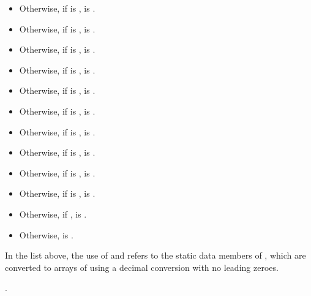 \begin{itemdescr}
\begin{itemize}
\item
Otherwise, if  is ,
 is .

\item
Otherwise, if  is ,
 is .

\item
Otherwise, if  is ,
 is .

\item
Otherwise, if  is ,
 is .

\item
Otherwise, if  is ,
 is .

\item
Otherwise, if  is ,
 is .

\item
Otherwise, if  is ,
 is .

\item
Otherwise, if  is ,
 is .

\item
Otherwise, if  is ,
 is .

\item
Otherwise, if  is ,
 is .

\item
Otherwise, if ,
 is .

\item
Otherwise,  is
.
\end{itemize}

In the list above,
the use of  and 
refers to the static data members of ,
which are converted to arrays of  using a decimal conversion with no leading zeroes.

\pnum
\returns
{}.
\end{itemdescr}

